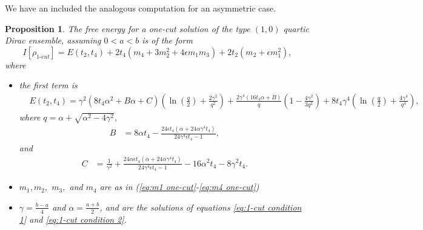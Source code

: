 \documentclass[10pt]{article}
\theoremstyle{plain}
\newtheorem{prop}[theorem]{Proposition}
\theoremstyle{definition}
\theoremstyle{plain}
\begin{document}
We have an included the analogous computation for an asymmetric case.
\begin{prop}\label{free energy theorem}
 	The free energy for a one-cut solution of the type $(1,0)$ quartic Dirac ensemble, assuming $0<a<b$ is of the form 
 \begin{equation}
 I[\rho_{\textit{1-cut}}] = E(t_{2},t_{4}) +2t_{4}(m_{4} + 3 m_{2}^2 + 4 \epsilon m_{1}m_{3}) + 2t_{2}(m_{2}+ \epsilon m_{1}^2),
 \end{equation}
 where
 \begin{itemize}
 \item the first term is \begin{align*}&E(t_{2},t_{4})=
\gamma^2\left( 8 t_{4}\alpha^2+B\alpha+C\right)
\left(
\ln\left(\frac{q}{2}\right)+\frac{2\gamma^2}{q^2}
\right)
+
\frac{2\gamma^4(16 t_{4}\alpha+B)}{q}
\left(
1-\frac{4\gamma^2}{3q^2}
\right)
+
8 t_{4}\gamma^4
\left(
\ln\left(\frac{q}{2}\right)+\frac{4\gamma^4}{q^4}
\right),
 \end{align*}
 where $q = \alpha + \sqrt{\alpha^2 - 4 \gamma^2}$,
 \begin{align*}
 B& = 8 \alpha t_{4}-\frac{24 \epsilon t_{4} \left(\alpha +24 \alpha \gamma ^4 t_{4}\right)}{24 \gamma ^4 \epsilon
 t_{4}-1},
 \end{align*}
 and
 \begin{align*}
 C & = \frac{1}{\gamma ^2}+\frac{24 \alpha \epsilon t_{4} \left(\alpha +24 \alpha \gamma ^4 t_{4}\right)}{24 \gamma ^4
 \epsilon t_{4}-1}-16 \alpha ^2 t_{4}-8 \gamma ^2 t_{4}.
 \end{align*}
 \item $m_{1},m_{2},$ $m_{3},$ and $m_{4}$ are as in (\ref{eq:m1 one-cut}-\ref{eq:m4 one-cut}) 
 \item $\gamma = \frac{b-a}{4}$ and $\alpha=\frac{a+b}{2}$, and are the solutions of equations \eqref{eq:1-cut condition 1} and \eqref{eq:1-cut condition 2}.
 \end{itemize}
\end{prop}
\end{document}
